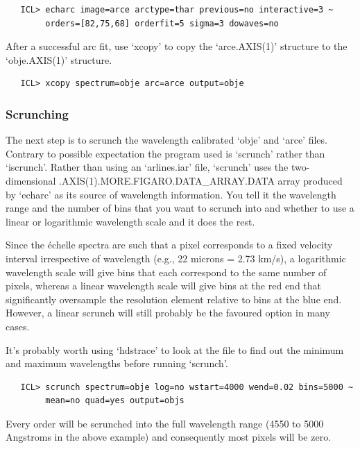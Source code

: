 \begin{verbatim}
   ICL> echarc image=arce arctype=thar previous=no interactive=3 ~
        orders=[82,75,68] orderfit=5 sigma=3 dowaves=no
\end{verbatim}

   After a successful arc fit, use `xcopy' to copy the `arce.AXIS(1)'
   structure to the `obje.AXIS(1)' structure.

\begin{verbatim}
   ICL> xcopy spectrum=obje arc=arce output=obje
\end{verbatim}


\subsubsection{\label{techno13scrunch}Scrunching}

   The next step is to scrunch the wavelength calibrated `obje' and
   `arce' files. Contrary to possible expectation the program used is
   `scrunch' rather than `iscrunch'. Rather than using an `arlines.iar'
   file, `scrunch' uses the two-dimensional
   .AXIS(1).\-MORE.\-FIGARO.\-DATA\_\-ARRAY.\-DATA array produced by
   `echarc' as its source of wavelength information. You tell it the
   wavelength range and the number of bins that you want to scrunch into
   and whether to use a linear or logarithmic wavelength scale and it
   does the rest.

   Since the \'echelle spectra are such that a pixel corresponds to
   a fixed velocity interval irrespective of wavelength (e.g., 22
   microns = 2.73 km/s), a logarithmic wavelength scale will give bins
   that each correspond to the same number of pixels, whereas a linear
   wavelength scale will give bins at the red end that significantly
   oversample the resolution element relative to bins at the blue end.
   However, a linear scrunch will still probably be the favoured option
   in many cases.

   It's probably worth using `hdstrace' to look at the file to find
   out the minimum and maximum wavelengths before running `scrunch'.

\begin{verbatim}
   ICL> scrunch spectrum=obje log=no wstart=4000 wend=0.02 bins=5000 ~
        mean=no quad=yes output=objs
\end{verbatim}

   Every order will be scrunched into the full wavelength range (4550 to
   5000 Angstroms in the above example) and consequently most pixels
   will be zero.

